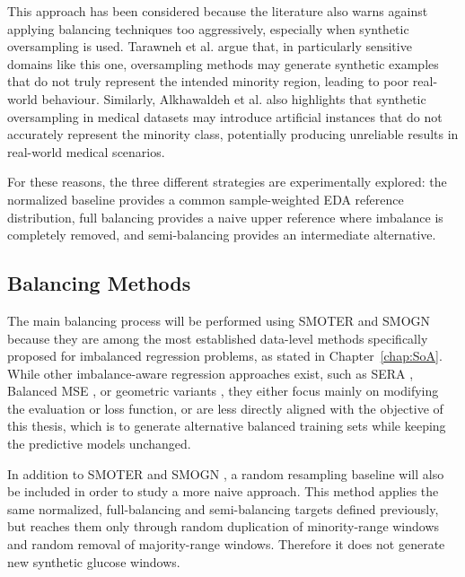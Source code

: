 This approach has been considered because the literature also warns against applying balancing techniques too aggressively, especially when synthetic oversampling is used. Tarawneh et al. \cite{9761871} argue that, in particularly sensitive domains like this one, oversampling methods may generate synthetic examples that do not truly represent the intended minority region, leading to poor real-world behaviour. Similarly, Alkhawaldeh et al. \cite{alkhawaldeh2023challenges} also highlights that synthetic oversampling in medical datasets may introduce artificial instances that do not accurately represent the minority class, potentially producing unreliable results in real-world medical scenarios.

For these reasons, the three different strategies are experimentally explored: the normalized baseline provides a common sample-weighted EDA reference distribution, full balancing provides a naive upper reference where imbalance is completely removed, and semi-balancing provides an intermediate alternative.

\subsection{Balancing Methods}
\label{subsec:experimental_methodology_methods}

The main balancing process will be performed using SMOTER \cite{10.1007/978-3-642-40669-0_33} and SMOGN \cite{pmlr-v74-branco17a} because they are among the most established data-level methods specifically proposed for imbalanced regression problems, as stated in Chapter~\ref{chap:SoA}. While other imbalance-aware regression approaches exist, such as SERA \cite{5178874}, Balanced MSE \cite{Ren_2022_CVPR}, or geometric variants \cite{CAMACHO2022116387}, they either focus mainly on modifying the evaluation or loss function, or are less directly aligned with the objective of this thesis, which is to generate alternative balanced training sets while keeping the predictive models unchanged.

In addition to SMOTER \cite{10.1007/978-3-642-40669-0_33} and SMOGN \cite{pmlr-v74-branco17a}, a random resampling baseline will also be included in order to study a more naive approach. This method applies the same normalized, full-balancing and semi-balancing targets defined previously, but reaches them only through random duplication of minority-range windows and random removal of majority-range windows. Therefore it does not generate new synthetic glucose windows.

